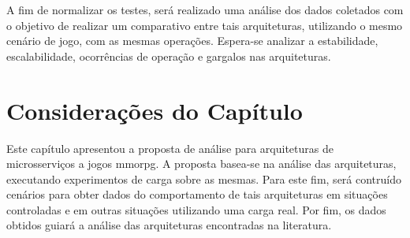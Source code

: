 A fim de normalizar os testes, será realizado uma análise dos dados coletados com o objetivo de realizar um comparativo entre tais arquiteturas, utilizando o mesmo cenário de jogo, com as mesmas operações.
%
Espera-se analizar a estabilidade, escalabilidade, ocorrências de operação e gargalos nas arquiteturas.



\section{Considerações do Capítulo}

Este capítulo apresentou a proposta de análise para arquiteturas de microsserviços a jogos \ac{mmorpg}.
%
A proposta basea-se na análise das arquiteturas, executando experimentos de carga sobre as mesmas.
%
Para este fim, será contruído cenários para obter dados do comportamento de tais arquiteturas em situações controladas e em outras situações utilizando uma carga real.
%
Por fim, os dados obtidos guiará a análise das arquiteturas encontradas na literatura.
